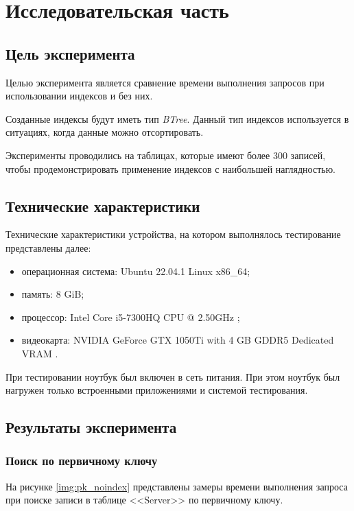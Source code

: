 \chapter{Исследовательская часть}

\section{Цель эксперимента}

Целью эксперимента является сравнение времени выполнения запросов при использовании индексов и без них. 

Созданные индексы будут иметь тип \textit{BTree}. Данный тип индексов используется в ситуациях, когда данные можно отсортировать.

Эксперименты проводились на таблицах, которые имеют более 300 записей, чтобы продемонстрировать применение индексов с наибольшей наглядностью.

\section{Технические характеристики}

Технические характеристики устройства, на котором выполнялось тестирование представлены далее:

\begin{itemize}
    \item операционная система: Ubuntu 22.04.1 \cite{ubuntu} Linux \cite{linux} x86\_64;
    \item память: 8 GiB;
    \item процессор: Intel Core i5-7300HQ CPU @ 2.50GHz \cite{intel};
    \item видеокарта: NVIDIA GeForce GTX 1050Ti with 4 GB GDDR5 Dedicated VRAM \cite{gtx1050}.
\end{itemize}

При тестировании ноутбук был включен в сеть питания. При этом ноутбук был нагружен только встроенными приложениями и системой тестирования. 


\section{Результаты эксперимента}

\subsection{Поиск по первичному ключу}

На рисунке \ref{img:pk_noindex} представлены замеры времени выполнения запроса при поиске записи в таблице <<Server>> по первичному ключу.

